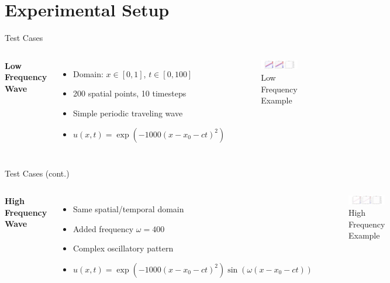 \documentclass{beamer}
\begin{document}
\section{Experimental Setup}
\begin{frame}{Test Cases}
    \begin{columns}
        \textbf{Low Frequency Wave}
        \begin{itemize}
            \item Domain: $x \in [0,1]$, $t \in [0,100]$
            \item 200 spatial points, 10 timesteps
            \item Simple periodic traveling wave
            \item $u(x,t) = \exp(-1000(x-x_0-ct)^2)$
        \end{itemize}
        
        \begin{figure}
            \includegraphics[width=\textwidth]{../../results/functional/low-frequency-adam-20250206-1105-1/vis}
            \caption{Low Frequency Example}
        \end{figure}
    \end{columns}
\end{frame}

\begin{frame}{Test Cases (cont.)}
    \begin{columns}
        \textbf{High Frequency Wave}
        \begin{itemize}
            \item Same spatial/temporal domain
            \item Added frequency $\omega = 400$
            \item Complex oscillatory pattern
            \item $u(x,t) = \exp(-1000(x-x_0-ct)^2)\sin(\omega(x-x_0-ct))$
        \end{itemize}
        
        \begin{figure}
            \includegraphics[width=\textwidth]{../../results/functional/high-frequency-adam-20250206-1520-1/vis}
            \caption{High Frequency Example}
        \end{figure}
    \end{columns}
\end{frame}
\end{document}
